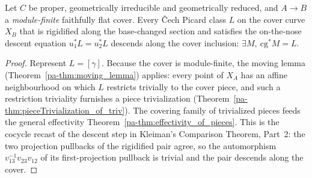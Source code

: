 \begin{theorem}
  \label{pa-thm:effectivity}
  \leanok

  Let \(C\) be proper, geometrically irreducible and geometrically reduced, and \(A \to B\) a
  \emph{module-finite} faithfully flat cover. Every \v Cech Picard class \(L\) on the cover curve
  \(X_B\) that is rigidified along the base-changed section and satisfies the on-the-nose descent
  equation \(u_1^{*}L = u_2^{*}L\) descends along the cover inclusion: \(\exists M,\ \mathrm{cg}^{*}M
  = L\).
\end{theorem}
\begin{proof}
  \leanok
  Represent \(L = [\gamma]\). Because the cover is module-finite, the moving lemma
  (Theorem~\ref{pa-thm:moving_lemma}) applies: every point of \(X_A\) has an affine neighbourhood on
  which \(L\) restricts trivially to the cover piece, and such a restriction triviality furnishes a
  piece trivialization (Theorem~\ref{pa-thm:pieceTrivialization_of_triv}). The covering family of
  trivialized pieces feeds the general effectivity Theorem~\ref{pa-thm:effectivity_of_pieces}. This is
  the cocycle recast of the descent step in Kleiman's Comparison Theorem, Part~2: the two projection
  pullbacks of the rigidified pair agree, so the automorphism \(v_{13}^{-1}v_{23}v_{12}\) of its
  first-projection pullback is trivial and the pair descends along the cover.
\end{proof}

